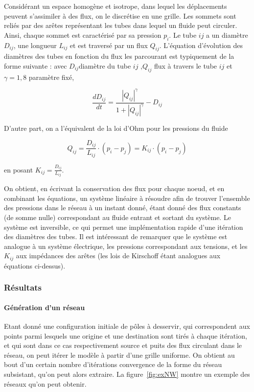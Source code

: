 \documentclass[french,12pt]{article}
\begin{document}
Considérant un espace homogène et isotrope, dans lequel les déplacements peuvent s'assimiler à des flux, on le discrétise en une grille. Les sommets sont reliés par des arêtes représentant les tubes dans lequel un fluide peut circuler. Ainsi, chaque sommet est caractérisé par sa pression $p_{i}$. Le tube $ij$ a un diamètre $D_{ij}$, une longueur $L_{ij}$ et est traversé par un flux $Q_{ij}$. L'équation d'évolution des diamètres des tubes en fonction du flux les parcourant est typiquement de la forme suivante : avec $D_{ij}$diamètre du tube $ij$ ,$Q_{ij}$ flux à travers le tube $ij$ et $\gamma=1,8$ paramètre fixé,

\begin{equation}
\frac{dD_{ij}}{dt}=\frac{\left|Q_{ij}\right|^{\gamma}}{1+\left|Q_{ij}\right|^{\gamma}}-D_{ij}
\end{equation}

D'autre part, on a l'équivalent de la loi d'Ohm pour les pressions du fluide

\begin{equation}
Q_{ij}=\frac{D_{ij}}{L_{ij}}\cdot(p_{i}-p_{j})=K_{ij}\cdot(p_{i}-p_{j})
\end{equation}

en posant $K_{ij}=\frac{D_{ij}}{L_{ij}}$.

On obtient, en écrivant la conservation des flux pour chaque noeud, et en combinant les équations, un système linéaire à résoudre afin de trouver l'ensemble des pressions dans le réseau à un instant donné, étant donné des flux constants (de somme nulle) correspondant au fluide entrant et sortant du système. Le système est inversible, ce qui permet une implémentation rapide d'une itération des diamètres des tubes. Il est intéressant de remarquer que le système est analogue à un système électrique, les pressions correspondant aux tensions, et les $K_{ij}$ aux impédances des arêtes (les lois de Kirschoff étant analogues aux équations ci-dessus).

\subsubsection{Résultats}

\paragraph{Génération d’un réseau}

Etant donné une configuration initiale de pôles à desservir, qui correspondent aux points parmi lesquels une origine et une destination sont tirés à chaque itération, et qui sont dans ce cas respectivement source et puits des flux circulant dans le réseau, on peut itérer le modèle à partir d’une grille uniforme. On obtient au bout d’un certain nombre d’itérations convergence de la forme du réseau subsistant, qu’on peut alors extraire. La figure~\ref{fig:exNW} montre un exemple des réseaux qu’on peut obtenir.
\end{document}
